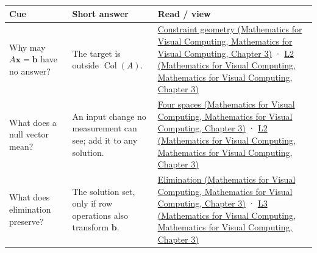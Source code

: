 {\def\LTcaptype{none} %
\begin{longtable}[]{@{}
  >{\raggedright\arraybackslash}p{}
  >{\raggedright\arraybackslash}p{}
  >{\raggedright\arraybackslash}p{}@{}}
\toprule\noalign{}
\begin{minipage}[b]{\linewidth}\raggedright
Cue
\end{minipage} & \begin{minipage}[b]{\linewidth}\raggedright
Short answer
\end{minipage} & \begin{minipage}[b]{\linewidth}\raggedright
Read / view
\end{minipage} \\
\midrule\noalign{}
\endhead
\bottomrule\noalign{}
\endlastfoot
Why may \(A\mathbf x=\mathbf b\) have no answer? & The target is outside \(\operatorname{Col}(A)\). & \href{../02-Mathematics-for-Visual-Computing/main.pdf\#nameddest=01-foundations-i-ch019-a-linear-equation-is-a-measurement-and-several-equations-are-geometry}{Constraint geometry (Mathematics for Visual Computing, Mathematics for Visual Computing, Chapter 3)} · \href{../02-Mathematics-for-Visual-Computing/main.pdf\#nameddest=01-foundations-i-ch019-figure-l2---consistency-freedom-and-the-four-fundamental-spaces}{L2 (Mathematics for Visual Computing, Mathematics for Visual Computing, Chapter 3)} \\
What does a null vector mean? & An input change no measurement can see; add it to any solution. & \href{../02-Mathematics-for-Visual-Computing/main.pdf\#nameddest=01-foundations-i-ch019-rank-separates-what-the-measurements-determine-from-what-they-leave-free}{Four spaces (Mathematics for Visual Computing, Mathematics for Visual Computing, Chapter 3)} · \href{../02-Mathematics-for-Visual-Computing/main.pdf\#nameddest=01-foundations-i-ch019-figure-l2---consistency-freedom-and-the-four-fundamental-spaces}{L2 (Mathematics for Visual Computing, Mathematics for Visual Computing, Chapter 3)} \\
What does elimination preserve? & The solution set, only if row operations also transform \(\mathbf b\). & \href{../02-Mathematics-for-Visual-Computing/main.pdf\#nameddest=01-foundations-i-ch019-elimination-turns-the-geometry-into-an-auditable-calculation}{Elimination (Mathematics for Visual Computing, Mathematics for Visual Computing, Chapter 3)} · \href{../02-Mathematics-for-Visual-Computing/main.pdf\#nameddest=01-foundations-i-ch019-figure-l3---elimination-stores-work-for-later-solves}{L3 (Mathematics for Visual Computing, Mathematics for Visual Computing, Chapter 3)} \\

\end{longtable}}
